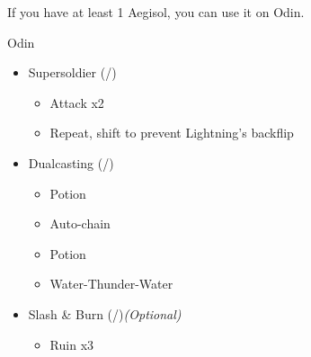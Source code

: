 \begin{paracol}{2}
	\renewcommand{\first}{[1] Slash \& Burn (\com/\rav)}
	\renewcommand{\second}{[2] Supersoldier (\com/\syn)}
	\renewcommand{\fourth}{[4] Dualcasting (\rav/\rav)}
	\renewcommand{\fifth}{[5] Dualcasting (\rav/\rav)}
	\switchcolumn*
	If you have at least 1 Aegisol, you can use it on Odin.
	\begin{battle}{Odin}
		\begin{itemize}
			\item \second
			      \begin{itemize}
				      \item Attack x2
				      \item Repeat, shift to prevent Lightning's backflip
			      \end{itemize}
			\item \fourth
			      \begin{itemize}
				      \item Potion
				      \item Auto-chain
				      \item Potion
				      \item Water-Thunder-Water
			      \end{itemize}
			\item \first \textit{(Optional)}
			      \begin{itemize}
				      \item Ruin x3
			      \end{itemize}


\end{itemize}
\end{battle}
\end{paracol}
